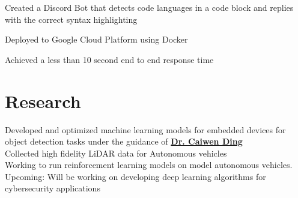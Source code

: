 \documentclass[]{resume-template}
\begin{document}
\begin{minipage}[t]{0.66\textwidth}
        \label{subsec:neatbot}
        \begin{tightemize}
            \item Created a Discord Bot that detects code languages in a code block and replies with the correct syntax highlighting
            \item Deployed to Google Cloud Platform using Docker
            \item Achieved a less than 10 second end to end response time
        \end{tightemize}




        \sectionsep{}



        \section{Research}\label{sec:research}
        \textbullet{} Developed and optimized machine learning models for embedded devices for object detection tasks under the guidance of \textbf{\href{https://caiwending.cse.uconn.edu/}{Dr. Caiwen Ding}} \\
        \textbullet{} Collected high fidelity LiDAR data for Autonomous vehicles \\
        \textbullet{} Working to run reinforcement learning models on model autonomous vehicles. \\
        \textbullet{} Upcoming: Will be working on developing deep learning algorithms for cybersecurity applications  
        \sectionsep



\end{minipage}
\end{document}
